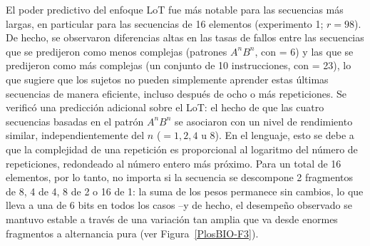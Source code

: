 El poder predictivo del enfoque LoT fue más notable para las secuencias más largas, en particular para las secuencias de 16 elementos (experimento 1; $r = 98$). De hecho, se observaron diferencias altas en las tasas de fallos entre las secuencias que se predijeron como menos complejas (patrones $A^nB^n$, con \mdlbin = 6) y las que se predijeron como más complejas (un conjunto de 10 instrucciones, con \mdlbin = 23), lo que sugiere que los sujetos no pueden simplemente aprender estas últimas secuencias de manera eficiente, incluso después de ocho o más repeticiones. Se verificó una predicción adicional sobre el LoT: el hecho de que las cuatro secuencias basadas en el patrón $A^nB^n$ se asociaron con un nivel de rendimiento similar, independientemente del $n$ ($= 1, 2, 4$ u $8$). En el lenguaje, esto se debe a que la complejidad de una repetición es proporcional al logaritmo del número de repeticiones, redondeado al número entero más próximo. Para un total de 16 elementos, por lo tanto, no importa si la secuencia se descompone 2 fragmentos de 8, 4 de 4, 8 de 2 o 16 de 1: la suma de los pesos permanece sin cambios, lo que lleva a una \mdlbin de 6 bits en todos los casos --y de hecho, el desempeño observado se mantuvo estable a través de una variación tan amplia que va desde enormes fragmentos a alternancia pura (ver Figura~\ref{PlosBIO-F3}).


